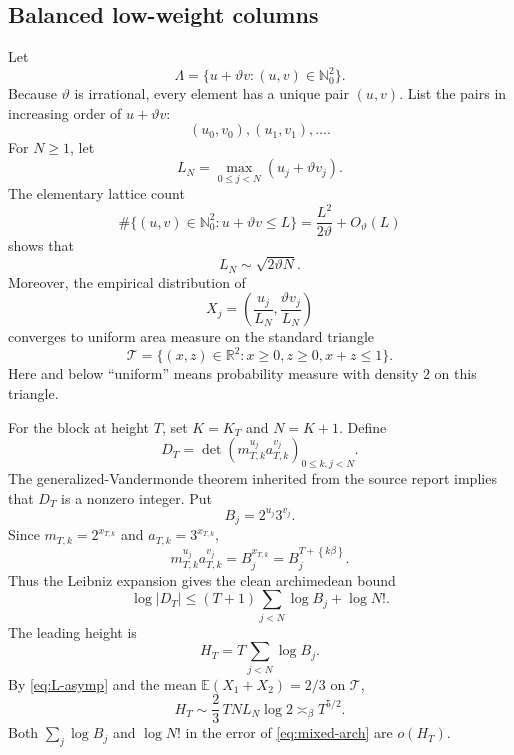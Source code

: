 \documentclass[11pt,oneside]{article}
\theoremstyle{definition}
\theoremstyle{remark}
\newcommand{\Nzero}{\mathbb N_0}
\newcommand{\R}{\mathbb R}
\newcommand{\fract}[1]{\left\{#1\right\}}
\newcommand{\DeltaTri}{\mathcal T}
\begin{document}
\subsection{Balanced low-weight columns}

Let
\[
  \Lambda=\{u+\vartheta v:(u,v)\in\Nzero^2\}.
\]
Because $\vartheta$ is irrational, every element has a unique pair $(u,v)$.  List the pairs
in increasing order of $u+\vartheta v$:
\[
  (u_0,v_0),(u_1,v_1),\ldots.
\]
For $N\ge1$, let
\[
  L_N=\max_{0\le j<N}(u_j+\vartheta v_j).
\]
The elementary lattice count
\begin{equation}\label{eq:semigroup-count}
 \#\{(u,v)\in\Nzero^2:u+\vartheta v\le L\}
 =\frac{L^2}{2\vartheta}+O_\vartheta(L)
\end{equation}
shows that
\begin{equation}\label{eq:L-asymp}
  L_N\sim\sqrt{2\vartheta N}.
\end{equation}
Moreover, the empirical distribution of
\begin{equation}\label{eq:scaled-cols}
  X_j=\left(\frac{u_j}{L_N},\frac{\vartheta v_j}{L_N}\right)
\end{equation}
converges to uniform area measure on the standard triangle
\begin{equation}\label{eq:triangle}
  \DeltaTri=\{(x,z)\in\R^2:x\ge0,
  z\ge0,
  x+z\le1\}.
\end{equation}
Here and below ``uniform'' means probability measure with density $2$ on this triangle.

For the block at height $T$, set $K=K_T$ and $N=K+1$.  Define
\begin{equation}\label{eq:mixed-D}
  D_T=\det\left(m_{T,k}^{u_j}a_{T,k}^{v_j}\right)_{0\le k,j<N}.
\end{equation}
The generalized-Vandermonde theorem inherited from the source report implies that $D_T$ is a
nonzero integer.  Put
\[
  B_j=2^{u_j}3^{v_j}.
\]
Since $m_{T,k}=2^{x_{T,k}}$ and $a_{T,k}=3^{x_{T,k}}$,
\begin{equation}\label{eq:entry-B}
  m_{T,k}^{u_j}a_{T,k}^{v_j}=B_j^{x_{T,k}}
  =B_j^{T+\fract{k\beta}}.
\end{equation}
Thus the Leibniz expansion gives the clean archimedean bound
\begin{equation}\label{eq:mixed-arch}
  \log|D_T|
  \le (T+1)\sum_{j<N}\log B_j+\log N!.
\end{equation}
The leading height is
\begin{equation}\label{eq:HT}
  H_T=T\sum_{j<N}\log B_j.
\end{equation}
By \eqref{eq:L-asymp} and the mean
$\mathbb E(X_1+X_2)=2/3$ on $\DeltaTri$,
\begin{equation}\label{eq:H-asymp}
 H_T\sim \frac23\,TNL_N\log2
 \asymp_\beta T^{5/2}.
\end{equation}
Both $\sum_j\log B_j$ and $\log N!$ in the error of \eqref{eq:mixed-arch} are
$o(H_T)$.
\end{document}
